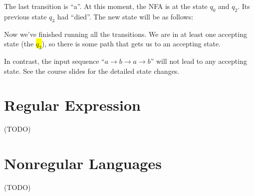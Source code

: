 \documentclass[12pt, letterpaper, oneside]{book}
\begin{document}
The last transition is ``a''. At this moment, the NFA is at the state $q_0$ and $q_2$. Its previous state $q_3$ had
``died''. The new state will be as follows:


Now we've finished running all the transitions. We are in at least one accepting state (the \colorbox{yellow}{$q_3$}),
so there is some path that gets us to an accepting state.

In contrast, the input sequence ``$a \rightarrow b \rightarrow a \rightarrow b$'' will not lead to any accepting state.
See the course slides for the detailed state changes.

%
%

\chapter{Regular Expression}

 (TODO)

%
%

\chapter{Nonregular Languages}

 (TODO)

%
%
\end{document}
